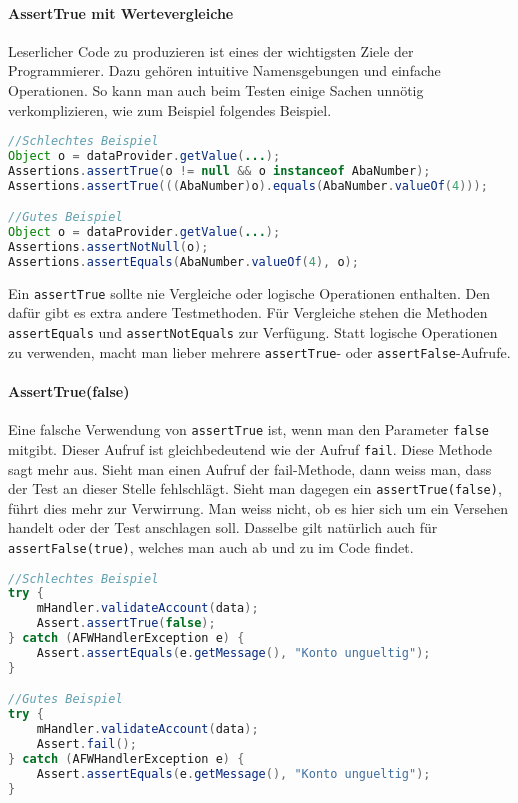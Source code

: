 \paragraph{AssertTrue mit Wertevergleiche}
Leserlicher Code zu produzieren ist eines der wichtigsten Ziele der Programmierer. Dazu gehören intuitive Namensgebungen und einfache Operationen. So kann man auch beim Testen einige Sachen unnötig verkomplizieren, wie zum Beispiel folgendes Beispiel.
\begin{lstlisting}[language=Java, caption={assertTrue falsch eingesetzt \protect\citeA{web:abawikijunit5}}]
//Schlechtes Beispiel
Object o = dataProvider.getValue(...);
Assertions.assertTrue(o != null && o instanceof AbaNumber);
Assertions.assertTrue(((AbaNumber)o).equals(AbaNumber.valueOf(4)));

//Gutes Beispiel
Object o = dataProvider.getValue(...);
Assertions.assertNotNull(o);
Assertions.assertEquals(AbaNumber.valueOf(4), o);
\end{lstlisting}
Ein \texttt{assertTrue} sollte nie Vergleiche oder logische Operationen enthalten. Den dafür gibt es extra andere Testmethoden. Für Vergleiche stehen die Methoden \texttt{assertEquals} und \texttt{assertNotEquals} zur Verfügung. Statt logische Operationen zu verwenden, macht man lieber mehrere \texttt{assertTrue}- oder \texttt{assertFalse}-Aufrufe.
\paragraph{AssertTrue(false)}
Eine falsche Verwendung von \texttt{assertTrue} ist, wenn man den Parameter \texttt{false} mitgibt. Dieser Aufruf ist gleichbedeutend wie der Aufruf \texttt{fail}. Diese Methode sagt mehr aus. Sieht man einen Aufruf der fail-Methode, dann weiss man, dass der Test an dieser Stelle fehlschlägt. Sieht man dagegen ein \texttt{assertTrue(false)}, führt dies mehr zur Verwirrung. Man weiss nicht, ob es hier sich um ein Versehen handelt oder der Test anschlagen soll. Dasselbe gilt natürlich auch für \texttt{assertFalse(true)}, welches man auch ab und zu im Code findet.
\begin{lstlisting}[language=Java, caption={assertTrue(false) und fail()}]
//Schlechtes Beispiel
try {
	mHandler.validateAccount(data);
	Assert.assertTrue(false);
} catch (AFWHandlerException e) {
	Assert.assertEquals(e.getMessage(), "Konto ungueltig");
}

//Gutes Beispiel
try {
	mHandler.validateAccount(data);
	Assert.fail();
} catch (AFWHandlerException e) {
	Assert.assertEquals(e.getMessage(), "Konto ungueltig");
}
\end{lstlisting}
